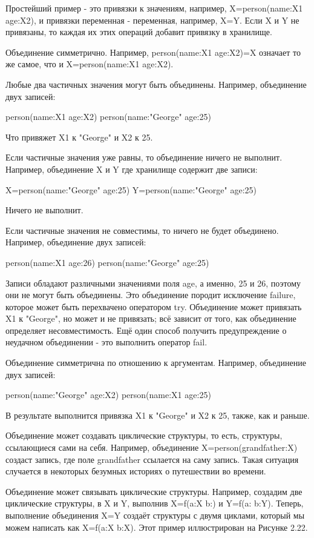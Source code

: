 Простейший пример - это привязки к значениям, например, X=person(name:X1 age:X2), и привязки переменная - переменная, например, X=Y. Если X и Y не привязаны, то каждая их этих операций добавит привязку в хранилище.

Объединение симметрично. Например, person(name:X1 age:X2)=X означает то же самое, что и X=person(name:X1 age:X2).

Любые два частичных значения могут быть объединены. Например, объединение двух записей:

person(name:X1 age:X2)
person(name:"George" age:25)

Что привяжет X1 к "George" и X2 к 25.

Если частичные значения уже равны, то объединение ничего не выполнит. Например, объединение X и Y где хранилище содержит две записи:

X=person(name:"George" age:25)
Y=person(name:"George" age:25)

Ничего не выполнит.

Если частичные значения не совместимы, то ничего не будет объединено. Например, объединение двух записей:

person(name:X1 age:26)
person(name:"George" age:25)

Записи обладают различными значениями поля age, а именно, 25 и 26, поэтому они не могут быть объединены. Это объединение породит исключение failure, которое может быть перехвачено оператором try. Объединение может привязать X1 к "George", но может и не привязать; всё зависит от того, как объединение определяет несовместимость. Ещё один способ получить предупреждение о неудачном объединении - это выполнить оператор fail.

Объединение симметрична по отношению к аргументам. Например, объединение двух записей:

person(name:"George" age:X2)
person(name:X1 age:25)

В результате выполнится привязка X1 к "George" и X2 к 25, также, как и раньше.

Объединение может создавать циклические структуры, то есть, структуры, ссылающиеся сами на себя. Например, объединение X=person(grandfather:X) создаст запись, где поле grandfather ссылается на саму запись. Такая ситуация случается в некоторых безумных историях о путешествии во времени.

Объединение может связывать циклические структуры. Например, создадим две циклические структуры, в X и Y, выполнив X=f(a:X b:) и Y=f(a: b:Y). Теперь, выполнение объединения X=Y создаёт структуры с двумя циклами, который мы можем написать как X=f(a:X b:X). Этот пример иллюстрирован на Рисунке 2.22.


